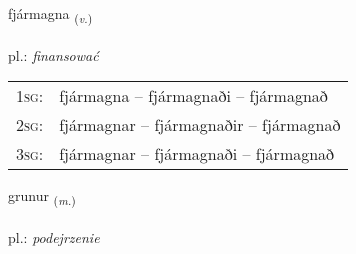 \documentclass[frontgrid, backgrid]{flacards}\usepackage[]{graphicx}\usepackage[]{xcolor}
\begin{document}
\renewcommand{\flhead}{\vskip5pt \fboxsep=0pt {\small\bfseries\footnotesize Sagnorð | czasownik}}
\renewcommand{\fcfoot}{\vskip5pt \fboxsep=0pt \hspace{2pt}{\small\bfseries\footnotesize 3K}}

\renewcommand{\blhead}{\vskip5pt {\small\bfseries\footnotesize Sagnorð | czasownik }}
\renewcommand{\bcfoot}{\vskip5pt \hspace{2pt}{\small\bfseries\footnotesize 3K}}


{fjármagna \small{\textsubscript{(\textit{v.})}} \\[1ex] %
\textphonetic{[fjaurmakna]} \\
pl.: \emph{finansować} \\  [2ex]
\renewcommand*{\arraystretch}{0.8}
\begin{tabular}{p{1cm}l}
\textsc{1sg}: & fjármagna -- fjármagnaði -- fjármagnað \\ 
\textsc{2sg}: & fjármagnar -- fjármagnaðir -- fjármagnað \\ 
\textsc{3sg}: & fjármagnar -- fjármagnaði -- fjármagnað \\ 
\end{tabular}
}

\renewcommand{\flhead}{\vskip5pt \fboxsep=0pt {\small\bfseries\footnotesize Nafnorð | rzeczownik}}
\renewcommand{\fcfoot}{\vskip5pt \fboxsep=0pt \hspace{2pt}{\small\bfseries\footnotesize 3K}}

\renewcommand{\blhead}{\vskip5pt {\small\bfseries\footnotesize Nafnorð | rzeczownik }}
\renewcommand{\bcfoot}{\vskip5pt \hspace{2pt}{\small\bfseries\footnotesize 3K}}


{grunur \small{\textsubscript{(\textit{m.})}} \\[1ex] %
\textphonetic{[krʏːnʏr]} \\
pl.: \emph{podejrzenie} \\  [2ex]
\renewcommand*{\arraystretch}{0.8}
}
\end{document}
